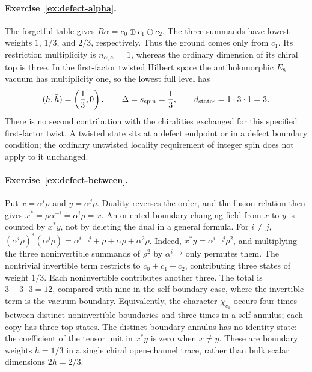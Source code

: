 \paragraph{Exercise~\ref{ex:defect-alpha}.}
\label{sol:ex:defect-alpha}
The forgetful table gives
$R\alpha=c_0\oplus c_1\oplus c_2$.
The three summands have lowest weights $1$, $1/3$, and $2/3$,
respectively. Thus the ground comes only from $c_1$.
Its restriction multiplicity is $n_{\alpha,c_1}=1$, whereas
the ordinary dimension of its chiral top is three.
In the first-factor twisted Hilbert space the antiholomorphic
$E_8$ vacuum has multiplicity one, so the lowest full level
has
\[
 (h,\bar h)=\left(\frac13,0\right),\qquad
 \Delta=s_{\rm spin}=\frac13,\qquad
 d_{\rm states}=1\cdot3\cdot1=3.
\]
There is no second contribution with the chiralities exchanged
for this specified first-factor twist.
A twisted state sits at a defect endpoint or in a
defect boundary condition; the ordinary untwisted locality
requirement of integer spin does not apply to it unchanged.



\paragraph{Exercise~\ref{ex:defect-between}.}
\label{sol:ex:defect-between}
Put $x=\alpha^i\rho$ and $y=\alpha^j\rho$.
Duality reverses the order, and the fusion relation then gives
$x^*=\rho\alpha^{-i}=\alpha^i\rho=x$.
An oriented boundary-changing field from $x$ to $y$ is counted
by $x^*y$, not by deleting the dual in a general formula.
For $i\ne j$,
$(\alpha^i\rho)^*(\alpha^j\rho)
=\alpha^{i-j}+\rho+\alpha\rho+\alpha^2\rho$.
Indeed, $x^*y=\alpha^{i-j}\rho^2$, and multiplying the
three noninvertible summands of $\rho^2$ by $\alpha^{i-j}$
only permutes them. The nontrivial invertible term restricts to
$c_0+c_1+c_2$, contributing three states of weight $1/3$.
Each noninvertible contributes another three. The total is
$3+3\cdot3=12$, compared with nine in the self-boundary
case, where the invertible term is the vacuum boundary.
Equivalently, the character $\chi_{c_1}$ occurs four times
between distinct noninvertible boundaries and three times
in a self-annulus; each copy has three top states.
The distinct-boundary annulus has no identity state:
the coefficient of the tensor unit in $x^*y$ is zero when
$x\ne y$. These are boundary weights $h=1/3$ in a single
chiral open-channel trace, rather than bulk scalar dimensions
$2h=2/3$.



